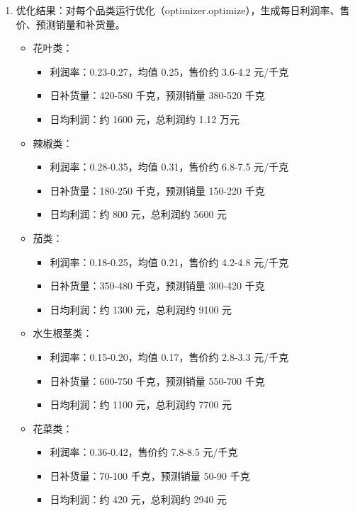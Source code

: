 \documentclass{cumcmthesis} %
\begin{document}
\begin{enumerate}
    \item 优化结果：对每个品类运行优化（optimizer.optimize），生成每日利润率、售价、预测销量和补货量。
    \begin{itemize}
        \item 花叶类：         
        \begin{itemize}
            \item 利润率：0.23-0.27，均值 0.25，售价约 3.6-4.2 元/千克
            \item 日补货量：420-580 千克，预测销量 380-520 千克
            \item 日均利润：约 1600 元，总利润约 1.12 万元
        \end{itemize}
        
        \item 辣椒类：
        \begin{itemize}
            \item 利润率：0.28-0.35，均值 0.31，售价约 6.8-7.5 元/千克
            \item 日补货量：180-250 千克，预测销量 150-220 千克
            \item 日均利润：约 800 元，总利润约 5600 元
        \end{itemize}
        
        \item 茄类：
        \begin{itemize}
            \item 利润率：0.18-0.25，均值 0.21，售价约 4.2-4.8 元/千克
            \item 日补货量：350-480 千克，预测销量 300-420 千克
            \item 日均利润：约 1300 元，总利润约 9100 元
        \end{itemize}
        
        \item 水生根茎类：
        \begin{itemize}
            \item 利润率：0.15-0.20，均值 0.17，售价约 2.8-3.3 元/千克
            \item 日补货量：600-750 千克，预测销量 550-700 千克
            \item 日均利润：约 1100 元，总利润约 7700 元
        \end{itemize}
        
        \item 花菜类：
        \begin{itemize}
            \item 利润率：0.36-0.42，售价约 7.8-8.5 元/千克
            \item 日补货量：70-100 千克，预测销量 50-90 千克
            \item 日均利润：约 420 元，总利润约 2940 元
        \end{itemize}

    \end{itemize}

\end{enumerate}
\end{document}
